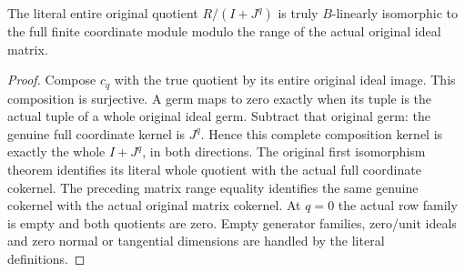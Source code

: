 \begin{theorem}
\label{hir:relative-normal-ideal-actual-matrix-cokernel}
\leanok
The literal entire original quotient $R/(I+J^q)$ is truly $B$-linearly
isomorphic to the full finite coordinate module modulo the range of the
actual original ideal matrix.
\end{theorem}
\begin{proof}
Compose $c_q$ with the true quotient by its entire original ideal image.
This composition is surjective. A germ maps to zero exactly when its tuple
is the actual tuple of a whole original ideal germ. Subtract that original
germ: the genuine full coordinate kernel is $J^q$. Hence this complete
composition kernel is exactly the whole $I+J^q$, in both directions.
The original first isomorphism theorem identifies its literal whole quotient
with the actual full coordinate cokernel. The preceding matrix range equality
identifies the same genuine cokernel with the actual original matrix cokernel.
At $q=0$ the actual row family is empty and both quotients are zero. Empty
generator families, zero/unit ideals and zero normal or tangential dimensions
are handled by the literal definitions.
\end{proof}

